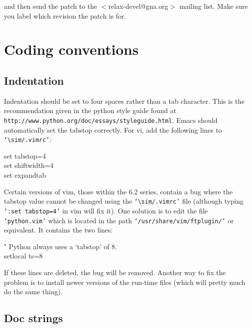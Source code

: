 
and then send the patch to the $<$relax-devel@gna.org$>$ mailing list.  Make sure you label which revision the patch is for.




\section{Coding conventions}


\subsection{Indentation}

Indentation should be set to four spaces rather than a tab character.  This is the recommendation given in the python style guide found at \texttt{http://www.python.org/doc/essays/styleguide.html}.  Emacs should automatically set the tabstop correctly.  For vi, add the following lines to \texttt{`$\sim$/.vimrc'}:

\begin{exampleenv}
set tabstop=4 \\
set shiftwidth=4 \\
set expandtab
\end{exampleenv}

Certain versions of vim, those within the 6.2 series, contain a bug where the tabstop value cannot be changed using the \texttt{`$\sim$/.vimrc'} file (although typing \texttt{`:set tabstop=4'} in vim will fix it).  One solution is to edit the file \texttt{`python.vim'} which is located in the path \texttt{`/usr/share/vim/ftplugin/'} or equivalent. It contains the two lines:

\begin{exampleenv}
" Python always uses a `tabstop' of 8. \\
setlocal ts=8
\end{exampleenv}

If these lines are deleted, the bug will be removed.  Another way to fix the problem is to install newer versions of the run-time files (which will pretty much do the same thing).


\subsection{Doc strings}

